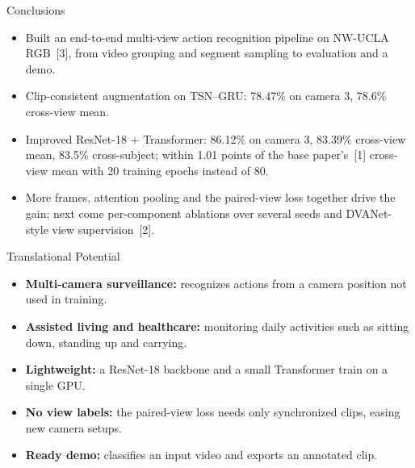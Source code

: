 \documentclass{article}
\begin{document}
\begin{tcbraster}[raster columns=2,raster equal height=rows,raster column skip=8mm,raster after skip=4mm]
\begin{psec}[after skip=0pt]{Conclusions}
\begin{itemize}
\item Built an end-to-end multi-view action recognition pipeline on NW-UCLA RGB~[3], from video grouping and segment sampling to evaluation and a demo.
\item Clip-consistent augmentation on TSN--GRU: 78.47\% on camera 3, 78.6\% cross-view mean.
\item Improved ResNet-18 + Transformer: 86.12\% on camera 3, 83.39\% cross-view mean, 83.5\% cross-subject; within 1.01 points of the base paper's~[1] cross-view mean with 20 training epochs instead of 80.
\item More frames, attention pooling and the paired-view loss together drive the gain; next come per-component ablations over several seeds and DVANet-style view supervision~[2].
\end{itemize}
\end{psec}
\begin{psec}[after skip=0pt]{Translational Potential}
\begin{itemize}
\item \textbf{Multi-camera surveillance:} recognizes actions from a camera position not used in training.
\item \textbf{Assisted living and healthcare:} monitoring daily activities such as sitting down, standing up and carrying.
\item \textbf{Lightweight:} a ResNet-18 backbone and a small Transformer train on a single GPU.
\item \textbf{No view labels:} the paired-view loss needs only synchronized clips, easing new camera setups.
\item \textbf{Ready demo:} classifies an input video and exports an annotated clip.
\end{itemize}
\end{psec}
\end{tcbraster}
\end{document}
